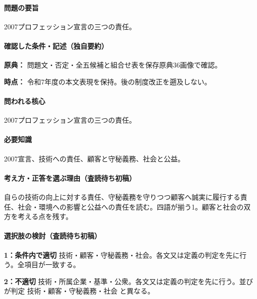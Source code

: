 \paragraph{問題の要旨} 2007プロフェッション宣言の三つの責任。

\paragraph{確認した条件・記述（独自要約）}\mbox{}\par

\noindent\textbf{原典：} 問題文・否定・全五候補と組合せ表を保存原典36画像で確認。\par

\noindent\textbf{時点：} 令和7年度の本文表現を保持。後の制度改正を遡及しない。\par

\paragraph{問われる核心} 2007プロフェッション宣言の三つの責任。

\paragraph{必要知識} 2007宣言、技術への責任、顧客と守秘義務、社会と公益。

\paragraph{考え方・正答を選ぶ理由（査読待ち初稿）} 自らの技術の向上に対する責任、守秘義務を守りつつ顧客へ誠実に履行する責任、社会・環境への影響と公益への責任を読む。四語が揃う1。顧客と社会の双方を考える点を残す。

\paragraph{選択肢の検討（査読待ち初稿）}\mbox{}\par

\noindent\textbf{1：条件内で適切} 技術・顧客・守秘義務・社会。各文又は定義の判定を先に行う。全項目が一致する。\par

\noindent\textbf{2：不適切} 技術・所属企業・基準・公衆。各文又は定義の判定を先に行う。並びが判定 技術・顧客・守秘義務・社会 と異なる。\par

